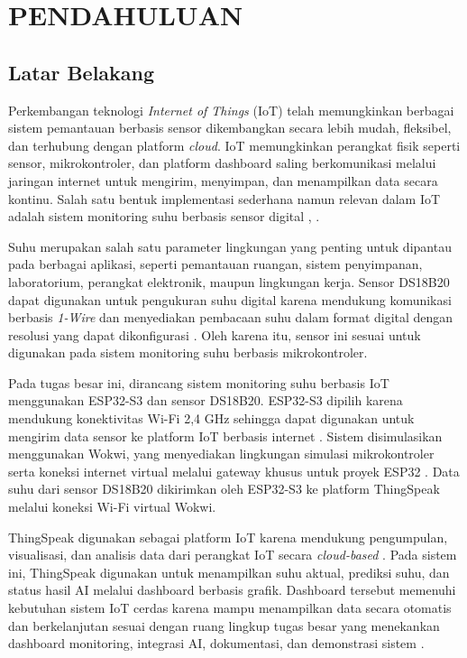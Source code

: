 \chapter{PENDAHULUAN}

\section{Latar Belakang}

Perkembangan teknologi \textit{Internet of Things} (IoT) telah memungkinkan
berbagai sistem pemantauan berbasis sensor dikembangkan secara lebih mudah,
fleksibel, dan terhubung dengan platform \textit{cloud}. IoT memungkinkan
perangkat fisik seperti sensor, mikrokontroler, dan platform dashboard saling
berkomunikasi melalui jaringan internet untuk mengirim, menyimpan, dan
menampilkan data secara kontinu. Salah satu bentuk implementasi sederhana
namun relevan dalam IoT adalah sistem monitoring suhu berbasis sensor digital
\cite{thingspeak2024}, \cite{thingspeak_iot2021}.

Suhu merupakan salah satu parameter lingkungan yang penting untuk dipantau
pada berbagai aplikasi, seperti pemantauan ruangan, sistem penyimpanan,
laboratorium, perangkat elektronik, maupun lingkungan kerja. Sensor DS18B20
dapat digunakan untuk pengukuran suhu digital karena mendukung komunikasi
berbasis \textit{1-Wire} dan menyediakan pembacaan suhu dalam format digital
dengan resolusi yang dapat dikonfigurasi \cite{ds18b20datasheet}. Oleh karena
itu, sensor ini sesuai untuk digunakan pada sistem monitoring suhu berbasis
mikrokontroler.

Pada tugas besar ini, dirancang sistem monitoring suhu berbasis IoT
menggunakan ESP32-S3 dan sensor DS18B20. ESP32-S3 dipilih karena mendukung
konektivitas Wi-Fi 2,4 GHz sehingga dapat digunakan untuk mengirim data
sensor ke platform IoT berbasis internet \cite{esp32s3espressif}. Sistem
disimulasikan menggunakan Wokwi, yang menyediakan lingkungan simulasi
mikrokontroler serta koneksi internet virtual melalui gateway khusus untuk
proyek ESP32 \cite{wokwi_wifi}. Data suhu dari sensor DS18B20 dikirimkan oleh
ESP32-S3 ke platform ThingSpeak melalui koneksi Wi-Fi virtual Wokwi.

ThingSpeak digunakan sebagai platform IoT karena mendukung pengumpulan,
visualisasi, dan analisis data dari perangkat IoT secara
\textit{cloud-based} \cite{thingspeak2024}. Pada sistem ini, ThingSpeak
digunakan untuk menampilkan suhu aktual, prediksi suhu, dan status hasil AI
melalui dashboard berbasis grafik. Dashboard tersebut memenuhi kebutuhan
sistem IoT cerdas karena mampu menampilkan data secara otomatis dan
berkelanjutan sesuai dengan ruang lingkup tugas besar yang menekankan
dashboard monitoring, integrasi AI, dokumentasi, dan demonstrasi sistem
\cite{tugasbesar2026}.

